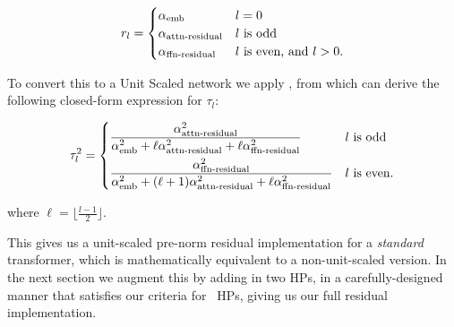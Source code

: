 \begin{equation*}
    r_l = \begin{cases}
        \alpha_{\mathrm{emb}} & l = 0
        \\
        \alpha_{\mathrm{attn{\text -}residual}} & l \textrm{ is odd }
        \\
        \alpha_{\mathrm{ffn{\text -}residual}} & l \textrm{ is even, and } l > 0.
    \end{cases}
\end{equation*}

To convert this to a Unit Scaled network we apply , from which can derive the following closed-form expression for $\tau_l$:

\begin{equation*}
    \tau^2_l = \begin{dcases}
        \frac{\alpha^2_{\mathrm{attn{\text -}residual}}}{\alpha^2_{\mathrm{emb}} + \ell \alpha^2_{\mathrm{attn{\text -}residual}} + \ell \alpha^2_{\mathrm{ffn{\text -}residual}}} & l \textrm{ is odd }
        \\
        \frac{\alpha^2_{\mathrm{ffn{\text -}residual}}}{\alpha^2_{\mathrm{emb}} + (\ell + 1) \alpha^2_{\mathrm{attn{\text -}residual}} + \ell \alpha^2_{\mathrm{ffn{\text -}residual}}} & l \textrm{ is even}.
    \end{dcases}
\end{equation*}

where $\ell = \lfloor{\frac{l-1}{2}}\rfloor$.

This gives us a unit-scaled pre-norm residual implementation for a \textit{standard} transformer, which is mathematically equivalent to a non-unit-scaled version. In the next section we augment this by adding in two HPs, in a carefully-designed manner that satisfies our criteria for \umup\ HPs, giving us our full residual implementation.
